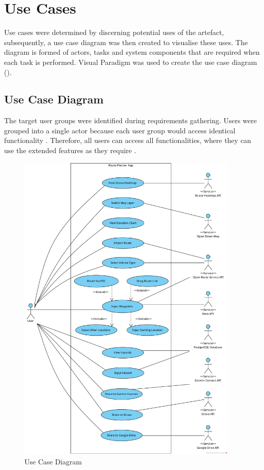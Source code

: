   \clearpage
\section{Use Cases}
\label{design:usecase}
Use cases were determined by discerning potential uses of the artefact, subsequently, a use case diagram was then created to visualise these uses. The diagram is formed of actors, tasks and system components that are required when each task is performed. Visual Paradigm was used to create the use case diagram (\cite{noauthor_ideal_nodate}).

\subsection{Use Case Diagram}
\label{usecase:diagram}
The target user groups were identified during requirements gathering. Users were grouped into a single actor because each user group would access identical functionality . Therefore, all users can access all functionalities, where they can use the extended features as they require .

\begin{figure}[!ht]
  \centering
  \includegraphics[width=400px]{figures/use-case.png}
  \caption{Use Case Diagram}
  \label{fig:usecase}
\end{figure}

